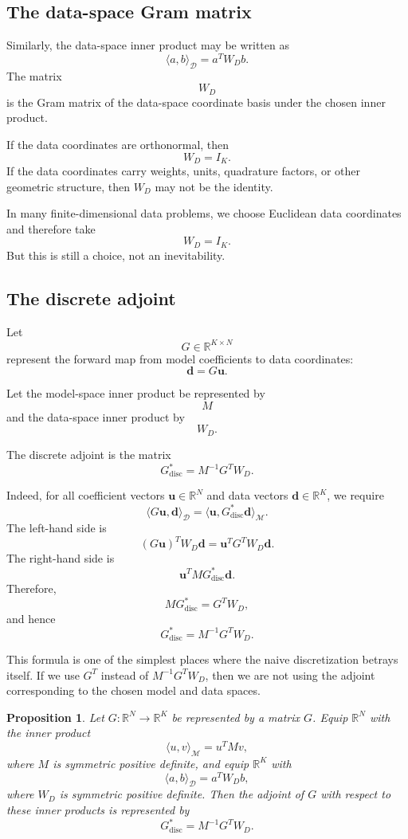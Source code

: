 \documentclass[11pt,a4paper]{book}
\newtheorem{proposition}[definition]{Proposition}
\newcommand{\M}{\mathcal{M}}      %
\newcommand{\D}{\mathcal{D}}      %
\newcommand{\R}{\mathbb{R}}
\begin{document}
\subsection{The data-space Gram matrix}

Similarly, the data-space inner product may be written as
\[
    \langle a,b\rangle_{\D}
    =
    a^T W_D b.
\]
The matrix
\[
    W_D
\]
is the Gram matrix of the data-space coordinate basis under the chosen inner
product.

If the data coordinates are orthonormal, then
\[
    W_D=I_K.
\]
If the data coordinates carry weights, units, quadrature factors, or other
geometric structure, then $W_D$ may not be the identity.

In many finite-dimensional data problems, we choose Euclidean data coordinates
and therefore take
\[
    W_D=I_K.
\]
But this is still a choice, not an inevitability.

\subsection{The discrete adjoint}

Let
\[
    G\in\R^{K\times N}
\]
represent the forward map from model coefficients to data coordinates:
\[
    \bm{d}=G\bm{u}.
\]

Let the model-space inner product be represented by
\[
    M
\]
and the data-space inner product by
\[
    W_D.
\]

The discrete adjoint is the matrix
\[
    G^\ast_{\mathrm{disc}}
    =
    M^{-1}G^T W_D.
\]

Indeed, for all coefficient vectors $\bm{u}\in\R^N$ and data vectors
$\bm{d}\in\R^K$, we require
\[
    \langle G\bm{u},\bm{d}\rangle_{\D}
    =
    \langle \bm{u},G^\ast_{\mathrm{disc}}\bm{d}\rangle_{\M}.
\]
The left-hand side is
\[
    (G\bm{u})^T W_D\bm{d}
    =
    \bm{u}^T G^T W_D\bm{d}.
\]
The right-hand side is
\[
    \bm{u}^T M G^\ast_{\mathrm{disc}}\bm{d}.
\]
Therefore,
\[
    M G^\ast_{\mathrm{disc}}
    =
    G^T W_D,
\]
and hence
\[
    G^\ast_{\mathrm{disc}}
    =
    M^{-1}G^T W_D.
\]

This formula is one of the simplest places where the naive discretization
betrays itself. If we use $G^T$ instead of $M^{-1}G^T W_D$, then we are not
using the adjoint corresponding to the chosen model and data spaces.

\begin{proposition}
Let $G:\R^N\to\R^K$ be represented by a matrix $G$. Equip $\R^N$ with the inner
product
\[
    \langle u,v\rangle_{\M}=u^T Mv,
\]
where $M$ is symmetric positive definite, and equip $\R^K$ with
\[
    \langle a,b\rangle_{\D}=a^T W_D b,
\]
where $W_D$ is symmetric positive definite. Then the adjoint of $G$ with
respect to these inner products is represented by
\[
    G^\ast_{\mathrm{disc}}
    =
    M^{-1}G^T W_D.
\]
\end{proposition}
\end{document}

